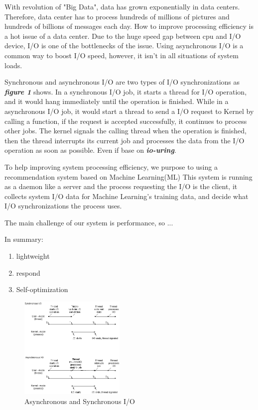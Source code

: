 \documentclass[conference]{IEEEtran}
\begin{document}
With revolution of "Big Data", data has grown exponentially in data centers. Therefore, data center has to process hundreds of millions of pictures and hundreds of billions of messages each day.
How to improve processing efficiency is a hot issue of a data center. Due to the huge speed gap between cpu and I/O device, I/O is one of the bottlenecks of the issue.
Using asynchronous I/O is a common way to boost I/O speed, however, it isn't in all situations of system loads. 

Synchronous and asynchronous I/O are two types of I/O synchronizations as  \emph{\textbf{\large{figure 1}}} shows. In a synchronous I/O job, it starts a thread for I/O operation, and it would hang immediately until the operation is finished.
While in a asynchronous I/O job, it would start a thread to send a I/O request to Kernel by calling a function, if the request is accepted successfully, it continues to process other jobs. 
The kernel signals the calling thread when the operation is finished, then the thread interrupts its current job and processes the data from the I/O operation as soon as possible.
Even if base on \emph{\textbf{io-uring}}.

To help improving system processing efficiency, we purpose to using a recommendation system based on Machine Learning(ML)
This system is running as a daemon like a server and the process requesting the I/O is the client, it collects system I/O data for Machine Learning's training data,
and decide what I/O synchronizations the process uses.

The main challenge of our system is performance, so ...

In summary:
\begin{enumerate}
    \item lightweight
    \item respond 
    \item Self-optimization
\end{enumerate}


\begin{figure}[htbp]
        \centering
        \includegraphics[width=0.45\textwidth]{fig2bedit.png}
        \caption{Asynchronous and Synchronous I/O}
\end{figure}
\end{document}
